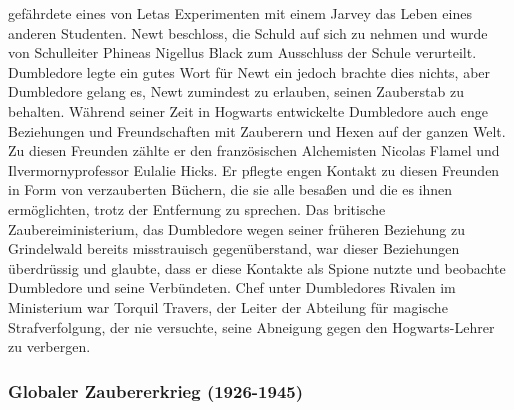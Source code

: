 \documentclass[a4paper, 10pt]{article}
\begin{document}
 gefährdete eines von Letas Experimenten mit einem Jarvey das Leben eines anderen Studenten. Newt beschloss, die Schuld auf sich zu nehmen und wurde von Schulleiter Phineas Nigellus Black zum Ausschluss der Schule verurteilt. Dumbledore legte ein gutes Wort für Newt ein jedoch brachte dies nichts, aber Dumbledore gelang es, Newt zumindest zu erlauben, seinen Zauberstab zu behalten.
\vspace{10pt}
\newline
Während seiner Zeit in Hogwarts entwickelte Dumbledore auch enge Beziehungen und Freundschaften mit Zauberern und Hexen auf der ganzen Welt. Zu diesen Freunden zählte er den französischen Alchemisten Nicolas Flamel und Ilvermornyprofessor Eulalie Hicks. Er pflegte engen Kontakt zu diesen Freunden in Form von verzauberten Büchern, die sie alle besaßen und die es ihnen ermöglichten, trotz der Entfernung zu sprechen. Das britische Zaubereiministerium, das Dumbledore wegen seiner früheren Beziehung zu Grindelwald bereits misstrauisch gegenüberstand, war dieser Beziehungen überdrüssig und glaubte, dass er diese Kontakte als Spione nutzte und beobachte Dumbledore und seine Verbündeten. Chef unter Dumbledores Rivalen im Ministerium war Torquil Travers, der Leiter der Abteilung für magische Strafverfolgung, der nie versuchte, seine Abneigung gegen den Hogwarts-Lehrer zu verbergen.

\subsubsection*{\large Globaler Zaubererkrieg (1926-1945)}
\end{document}
